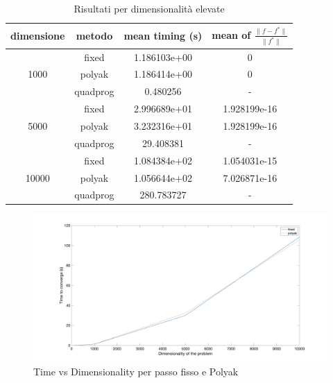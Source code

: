 

\begin{table}[H]
    \begin{adjustbox}{center}
    \begin{tabular}{|c||c||c|c|}
    \hline
    dimensione & metodo & mean timing (s) & mean of $\frac{\|f - f^*\|}{\|f^*\|}$ \\ \hline\hline
    
    \multirow{3}{*}{1000}  & fixed  & 1.186103e+00 & 0\\
                           & polyak & 1.186414e+00 & 0\\
                           & quadprog & 0.480256 & - \\ \hline\hline
                           
    \multirow{3}{*}{5000}  & fixed  & 2.996689e+01  & 1.928199e-16  \\
                           & polyak & 3.232316e+01 & 1.928199e-16  \\
                           & quadprog & 29.408381  & - \\ \hline\hline
                           
    \multirow{3}{*}{10000} & fixed  & 1.084384e+02 & 1.054031e-15  \\
                           & polyak & 1.056644e+02 & 7.026871e-16 \\
                           & quadprog & 280.783727 & - \\ \hline
    \end{tabular}
    \end{adjustbox}
    \caption{Risultati per dimensionalità elevate}
    \label{tab:high_dim}
\end{table}

\begin{figure}[H]
\centering
    \includegraphics[width=20cm, center]{./plots/time_dimensionality.png}
    \caption{Time vs Dimensionality per passo fisso e Polyak}
    \label{fig:high_dim}
\end{figure} 

